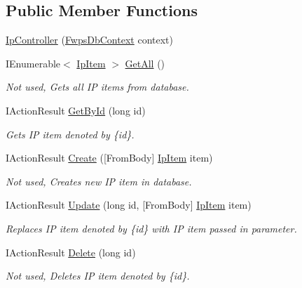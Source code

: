 \subsection*{Public Member Functions}
\begin{DoxyCompactItemize}
\item 
\mbox{\hyperlink{class_f_w_p_s_1_1_controllers_1_1_ip_controller_a92f0d0ff639328863f8485ef1f5c8a51}{Ip\+Controller}} (\mbox{\hyperlink{class_f_w_p_s_1_1_data_1_1_fwps_db_context}{Fwps\+Db\+Context}} context)
\item 
I\+Enumerable$<$ \mbox{\hyperlink{class_f_w_p_s_1_1_models_1_1_ip_item}{Ip\+Item}} $>$ \mbox{\hyperlink{class_f_w_p_s_1_1_controllers_1_1_ip_controller_a7dbbca42293fc173fae7e4a76660e2c2}{Get\+All}} ()
\begin{DoxyCompactList}\small\item\em Not used, Gets all IP items from database. \end{DoxyCompactList}\item 
I\+Action\+Result \mbox{\hyperlink{class_f_w_p_s_1_1_controllers_1_1_ip_controller_a196ed934dd681d3c6ae7dc825a68d2c2}{Get\+By\+Id}} (long id)
\begin{DoxyCompactList}\small\item\em Gets IP item denoted by \{id\}. \end{DoxyCompactList}\item 
I\+Action\+Result \mbox{\hyperlink{class_f_w_p_s_1_1_controllers_1_1_ip_controller_a84681f490197522433ce269962e2d5a9}{Create}} (\mbox{[}From\+Body\mbox{]} \mbox{\hyperlink{class_f_w_p_s_1_1_models_1_1_ip_item}{Ip\+Item}} item)
\begin{DoxyCompactList}\small\item\em Not used, Creates new IP item in database. \end{DoxyCompactList}\item 
I\+Action\+Result \mbox{\hyperlink{class_f_w_p_s_1_1_controllers_1_1_ip_controller_a87843cd885322510221b64ea284bcbec}{Update}} (long id, \mbox{[}From\+Body\mbox{]} \mbox{\hyperlink{class_f_w_p_s_1_1_models_1_1_ip_item}{Ip\+Item}} item)
\begin{DoxyCompactList}\small\item\em Replaces IP item denoted by \{id\} with IP item passed in parameter. \end{DoxyCompactList}\item 
I\+Action\+Result \mbox{\hyperlink{class_f_w_p_s_1_1_controllers_1_1_ip_controller_a3cf3a7207085ea04af8a53b5db4bb8ad}{Delete}} (long id)
\begin{DoxyCompactList}\small\item\em Not used, Deletes IP item denoted by \{id\}. \end{DoxyCompactList}\end{DoxyCompactItemize}
